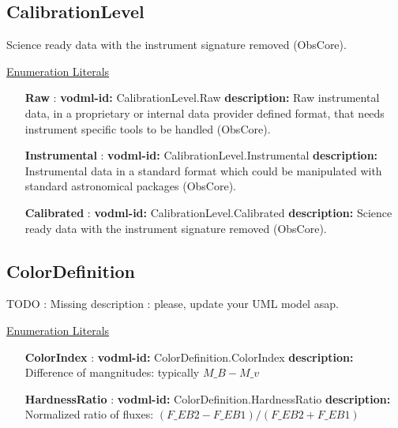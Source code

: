 {  \subsection{CalibrationLevel}
  \label{sect:CalibrationLevel}

  Science ready data with the instrument signature removed (ObsCore).

  \noindent \underline{Enumeration Literals}
  \vspace{-\parsep}
  \small
  \begin{itemize}
  
    \item[\textbf{Raw}]: \textbf{vodml-id:} CalibrationLevel.Raw \newline
          \textbf{description:} Raw instrumental data, in a proprietary or internal data provider defined format, that needs instrument specific tools to be handled (ObsCore).
    \item[\textbf{Instrumental}]: \textbf{vodml-id:} CalibrationLevel.Instrumental \newline
          \textbf{description:} Instrumental data in a standard format which could be manipulated with standard astronomical packages (ObsCore).
    \item[\textbf{Calibrated}]: \textbf{vodml-id:} CalibrationLevel.Calibrated \newline
          \textbf{description:} Science ready data with the instrument signature removed (ObsCore).
  \end{itemize}
  \normalsize


  \subsection{ColorDefinition}
  \label{sect:ColorDefinition}

  TODO : Missing description : please, update your UML model asap.

  \noindent \underline{Enumeration Literals}
  \vspace{-\parsep}
  \small
  \begin{itemize}
  
    \item[\textbf{ColorIndex}]: \textbf{vodml-id:} ColorDefinition.ColorIndex \newline
          \textbf{description:} Difference of mangnitudes: typically $M\_B - M\_v$
    \item[\textbf{HardnessRatio}]: \textbf{vodml-id:} ColorDefinition.HardnessRatio \newline
          \textbf{description:} Normalized ratio of fluxes: $(F\_{EB2} - F\_{EB1}) / (F\_{EB2} + F\_{EB1})$
  \end{itemize}
  \normalsize


}
